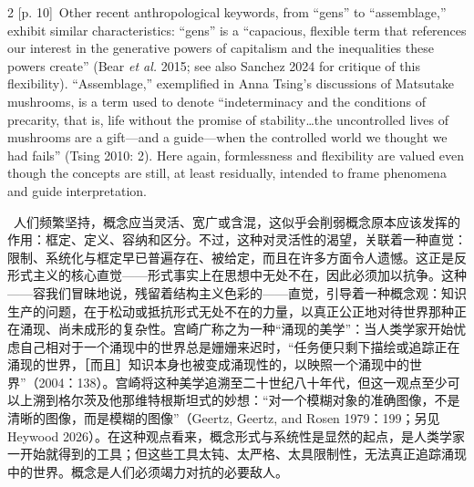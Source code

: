 \documentclass[10pt,a4paper]{article}
\begin{document}
\begin{paracol}{2}
\switchcolumn
{\scriptsize\color{gray} [p. 10]}\ Other recent anthropological keywords, from “gens” to “assemblage,” exhibit similar characteristics: “gens” is a “capacious, flexible term that references our interest in the generative powers of capitalism and the inequalities these powers create” (Bear \textit{et al.} 2015; see also Sanchez 2024 for critique of this flexibility). “Assemblage,” exemplified in Anna Tsing’s discussions of Matsutake mushrooms, is a term used to denote “indeterminacy and the conditions of precarity, that is, life without the promise of stability…the uncontrolled lives of mushrooms are a gift—and a guide—when the controlled world we thought we had fails” (Tsing 2010: 2). Here again, formlessness and flexibility are valued even though the concepts are still, at least residually, intended to frame phenomena and guide interpretation.\par
\switchcolumn*
{\scriptsize\color{gray} [p. 10]}\ 人们频繁坚持，概念应当灵活、宽广或含混，这似乎会削弱概念原本应该发挥的作用：框定、定义、容纳和区分。不过，这种对灵活性的渴望，关联着一种直觉：限制、系统化与框定早已普遍存在、被给定，而且在许多方面令人遗憾。这正是反形式主义的核心直觉——形式事实上在思想中无处不在，因此必须加以抗争。这种——容我们冒昧地说，残留着结构主义色彩的——直觉，引导着一种概念观：知识生产的问题，在于松动或抵抗形式无处不在的力量，以真正公正地对待世界那种正在涌现、尚未成形的复杂性。宫崎广称之为一种“涌现的美学”：当人类学家开始忧虑自己相对于一个涌现中的世界总是姗姗来迟时，“任务便只剩下描绘或追踪正在涌现的世界，［而且］知识本身也被变成涌现性的，以映照一个涌现中的世界”（2004：138）。宫崎将这种美学追溯至二十世纪八十年代，但这一观点至少可以上溯到格尔茨及他那维特根斯坦式的妙想：“对一个模糊对象的准确图像，不是清晰的图像，而是模糊的图像”（Geertz, Geertz, and Rosen 1979：199；另见 Heywood 2026）。在这种观点看来，概念形式与系统性是显然的起点，是人类学家一开始就得到的工具；但这些工具太钝、太严格、太具限制性，无法真正追踪涌现中的世界。概念是人们必须竭力对抗的必要敌人。\par
\switchcolumn

\end{paracol}
\end{document}
